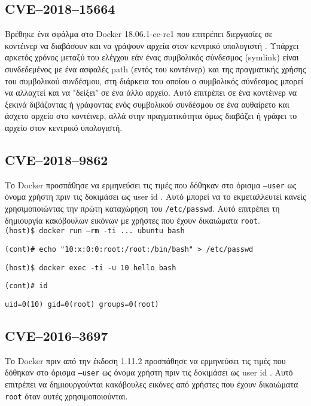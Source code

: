 \subsection{\textlatin{CVE–2018–15664}}

Βρέθηκε ένα σφάλμα στο \textlatin{Docker 18.06.1-ce-rc1} που επιτρέπει
διεργασίες σε κοντέινερ να διαβάσουν και να γράψουν αρχεία στον κεντρικό
υπολογιστή \cite{CVE-2018-15664-Openwall} \cite{CVE-2018-15664-Bugzilla}.
Υπάρχει αρκετός χρόνος μεταξύ του ελέγχου εάν ένας συμβολικός σύνδεσμος
(\textlatin{symlink}) είναι συνδεδεμένος με ένα ασφαλές \textlatin{path} (εντός
του κοντέινερ) και της πραγματικής χρήσης του συμβολικού συνδέσμου, στη διάρκεια
του οποίου ο συμβολικός σύνδεσμος μπορεί να αλλαχτεί και να "δείξει" σε ένα άλλο
αρχείο. Αυτό επιτρέπει σε ένα κοντέινερ να ξεκινά διβάζοντας ή γράφοντας ενός
συμβολικού συνδέσμου σε ένα αυθαίρετο και άσχετο αρχείο στο κοντέινερ, αλλά στην
πραγματικότητα όμως διαβάζει ή γράφει το αρχείο στον κεντρικό υπολογιστή.

\subsection{\textlatin{CVE–2018–9862}}

Το \textlatin{Docker} προσπάθησε να ερμηνεύσει τις τιμές που δόθηκαν στο όρισμα
\texttt{\textlatin{--user}} ως όνομα χρήστη πριν τις δοκιμάσει ως
\textlatin{user id} \cite{CVE-2018-9862-Github}. Αυτό μπορεί να το εκμεταλλευτεί
κανείς χρησιμοποιώντας την πρώτη καταχώρηση του \texttt{\textlatin{/etc/passwd}}.
Αυτό επιτρέπει τη δημιουργία κακόβουλων εικόνων με χρήστες που έχουν δικαιώματα
\texttt{\textlatin{root}}. \\

\texttt{\textlatin{(host)\$ docker run --rm -ti ... ubuntu bash}}

\texttt{\textlatin{(cont)\# echo "10:x:0:0:root:/root:/bin/bash" > /etc/passwd}}

\texttt{\textlatin{(host)\$ docker exec -ti -u 10 hello bash}}

\texttt{\textlatin{(cont)\# id}}

\texttt{\textlatin{uid=0(10) gid=0(root) groups=0(root)}} \\

\subsection{\textlatin{CVE–2016–3697}}

Το \textlatin{Docker} πριν από την έκδοση 1.11.2 προσπάθησε να ερμηνεύσει τις
τιμές που δόθηκαν στο όρισμα \texttt{\textlatin{--user}} ως όνομα χρήστη πριν
τις δοκιμάσει ως \textlatin{user id} \cite{CVE-2016-3697-Github}. Αυτό επιτρέπει
να δημιουργούνται κακόβουλες εικόνες από χρήστες που έχουν δικαιώματα
\texttt{\textlatin{root}} όταν αυτές χρησιμοποιούνται. \\

